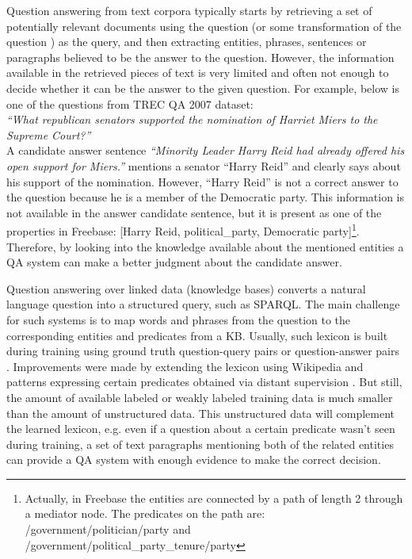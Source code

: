 Question answering from text corpora typically starts by retrieving a set of potentially relevant documents using the question (or some transformation of the question \cite{AgichteinLG01}) as the query, and then extracting entities, phrases, sentences or paragraphs believed to be the answer to the question.
However, the information available in the retrieved pieces of text is very limited and often not enough to decide whether it can be the answer to the given question.
For example, below is one of the questions from TREC QA 2007 dataset:\\
\textit{``What republican senators supported the nomination of Harriet Miers to the Supreme Court?''}\\
A candidate answer sentence \textit{``Minority Leader Harry Reid had already offered his open support for Miers.''} mentions a senator ``Harry Reid'' and clearly says about his support of the nomination.
However, ``Harry Reid'' is not a correct answer to the question because he is a member of the Democratic party.
This information is not available in the answer candidate sentence, but it is present as one of the properties in Freebase: [Harry Reid, political\_party, Democratic party]\footnote{Actually, in Freebase the entities are connected by a path of length 2 through a mediator node. The predicates on the path are: /government/politician/party and /government/political\_party\_tenure/party}.
Therefore, by looking into the knowledge available about the mentioned entities a QA system can make a better judgment about the candidate answer.

Question answering over linked data (knowledge bases) converts a natural language question into a structured query, such as SPARQL.
The main challenge for such systems is to map words and phrases from the question to the corresponding entities and predicates from a KB.
Usually, such lexicon is built during training using ground truth question-query pairs \cite{CaiY13} or question-answer pairs \cite{BerantCFL13:sempre}.
Improvements were made by extending the lexicon using Wikipedia and patterns expressing certain predicates obtained via distant supervision \cite{bastmore:cikm:2015:aquu,BordesCW14:emnlp,ReddyLS14,yih:ACL:2015:STAGG,YaoD14}.
But still, the amount of available labeled or weakly labeled training data is much smaller than the amount of unstructured data.
This unstructured data will complement the learned lexicon, e.g. even if a question about a certain predicate wasn't seen during training, a set of text paragraphs mentioning both of the related entities can provide a QA system with enough evidence to make the correct decision.

